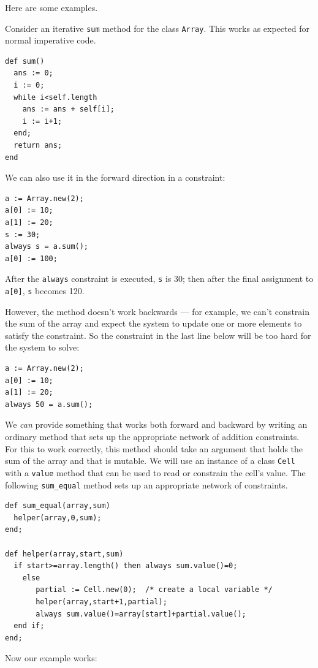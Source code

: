 \documentclass{article}
\newcounter{examples}
\begin{document}
Here are some examples.

Consider an iterative \verb|sum| method for the class \verb|Array|.
This works as expected for normal imperative code.

\begin{verbatim}
def sum()
  ans := 0;
  i := 0;
  while i<self.length
    ans := ans + self[i];
    i := i+1;
  end;
  return ans;
end
\end{verbatim}

We can also use it in the forward direction in a constraint:

\begin{verbatim}
a := Array.new(2);
a[0] := 10;
a[1] := 20;
s := 30;
always s = a.sum();
a[0] := 100;
\end{verbatim}

After the \verb|always| constraint is executed, \verb|s| is 30; then
after the final assignment to \verb|a[0]|, \verb|s| becomes 120.

However, the method doesn't work backwards --- for example, we can't
constrain the sum of the array and expect the system to update one or
more elements to satisfy the constraint.  So the constraint in the
last line below will be too hard for the system to solve:

\begin{verbatim}
a := Array.new(2);
a[0] := 10;
a[1] := 20;
always 50 = a.sum();
\end{verbatim}

We \emph{can} provide something that works both forward and backward
by writing an ordinary method that sets up the appropriate network of
addition constraints.  For this to work correctly, this method should
take an argument that holds the sum of the array and that is mutable.
We will use an instance of a class \verb|Cell| with a \verb|value|
method that can be used to read or constrain the cell's value.  The
following \verb|sum_equal| method sets up an appropriate network of
constraints.

\begin{verbatim}
def sum_equal(array,sum)
  helper(array,0,sum);
end;

def helper(array,start,sum)
  if start>=array.length() then always sum.value()=0;
    else 
       partial := Cell.new(0);  /* create a local variable */
       helper(array,start+1,partial);
       always sum.value()=array[start]+partial.value();
  end if;
end;  
\end{verbatim}

Now our example works:
\end{document}
